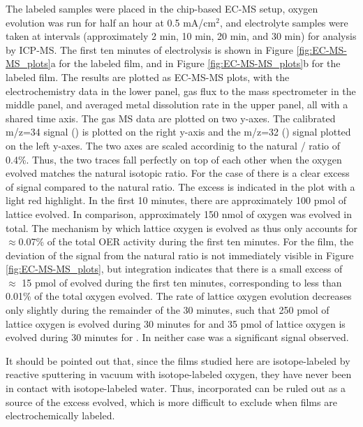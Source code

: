 The labeled samples were placed in the chip-based EC-MS setup, oxygen evolution was run for half an hour at 0.5 mA/cm$^2$, and electrolyte samples were taken at intervals (approximately 2 min, 10 min, 20 min, and 30 min) for analysis by ICP-MS. The first ten minutes of electrolysis is shown in Figure \ref{fig:EC-MS-MS_plots}a for the labeled  film, and in Figure \ref{fig:EC-MS-MS_plots}b for the labeled  film. The results are plotted as EC-MS-MS plots, with the electrochemistry data in the lower panel, gas flux to the mass spectrometer in the middle panel, and averaged metal dissolution rate in the upper panel, all with a shared time axis. The gas MS data are plotted on two y-axes. The calibrated m/z=34 signal () is plotted on the right y-axis and the m/z=32 () signal plotted on the left y-axes. The two axes are scaled accordinig to the natural / ratio of 0.4\%. Thus, the two traces fall perfectly on top of each other when the oxygen evolved matches the natural isotopic ratio. For the case of  there is a clear excess of  signal compared to the natural ratio. The excess is indicated in the plot with a light red highlight. In the first 10 minutes, there are approximately 100 pmol of lattice  evolved. In comparison, approximately 150 nmol of oxygen was evolved in total. The mechanism by which lattice oxygen is evolved as  thus only accounts for $\approx$0.07\% of the total OER activity during the first ten minutes. For the  film, the deviation of the  signal from the natural ratio is not immediately visible in Figure \ref{fig:EC-MS-MS_plots}, but integration indicates that there is a small excess of $\approx$ 15 pmol of  evolved during the first ten minutes, corresponding to less than 0.01\% of the total oxygen evolved. The rate of lattice oxygen evolution decreases only slightly during the remainder of the 30 minutes, such that 250 pmol of lattice oxygen is evolved during 30 minutes for  and 35 pmol of lattice oxygen is evolved during 30 minutes for . In neither case was a significant  signal observed. 

It should be pointed out that, since the films studied here are isotope-labeled by reactive sputtering in vacuum with isotope-labeled oxygen, they have never been in contact with isotope-labeled water. Thus, incorporated  can be ruled out as a source of the excess  evolved, which is more difficult to exclude when films are electrochemically labeled. 

